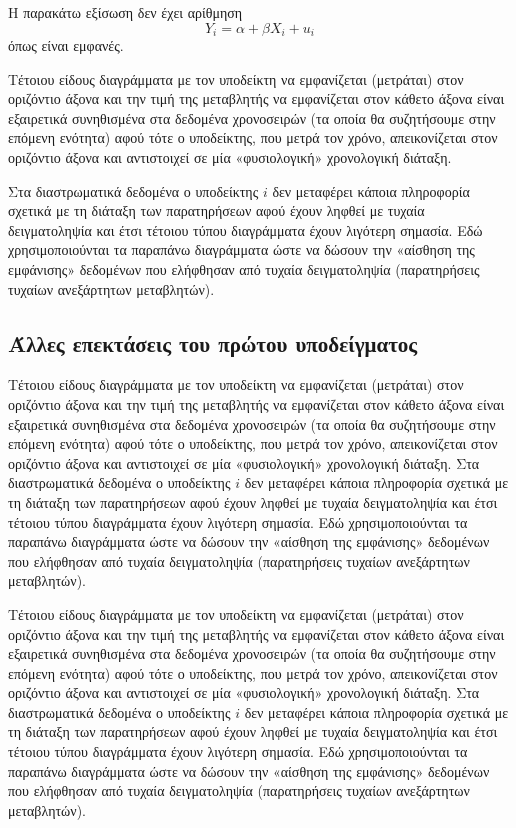 \documentclass[12pt,a4paper,oneside]{book}
\begin{document}
Η παρακάτω εξίσωση δεν έχει αρίθμηση
\begin{equation*}
Y_{i}=\alpha+\beta X_{i}+u_{i}
\end{equation*}
όπως είναι εμφανές.

Τέτοιου είδους διαγράμματα με τον υποδείκτη να εμφανίζεται (μετράται) στον οριζόντιο άξονα και την τιμή της μεταβλητής να εμφανίζεται στον κάθετο άξονα είναι εξαιρετικά συνηθισμένα στα δεδομένα χρονοσειρών (τα οποία θα συζητήσουμε στην επόμενη ενότητα) αφού τότε ο υποδείκτης, που μετρά τον χρόνο, απεικονίζεται στον οριζόντιο άξονα και αντιστοιχεί σε μία «φυσιολογική» χρονολογική διάταξη.

Στα διαστρωματικά δεδομένα ο υποδείκτης $i$ δεν μεταφέρει κάποια πληροφορία σχετικά με τη διάταξη των παρατηρήσεων αφού έχουν ληφθεί με τυχαία δειγματοληψία και έτσι τέτοιου τύπου διαγράμματα έχουν λιγότερη σημασία. Εδώ χρησιμοποιούνται τα παραπάνω διαγράμματα ώστε να δώσουν την «αίσθηση της εμφάνισης» δεδομένων που ελήφθησαν από τυχαία δειγματοληψία (παρατηρήσεις τυχαίων ανεξάρτητων μεταβλητών).

\subsection{Άλλες επεκτάσεις του πρώτου υποδείγματος}
Τέτοιου είδους διαγράμματα με τον υποδείκτη να εμφανίζεται (μετράται) στον οριζόντιο άξονα και την τιμή της μεταβλητής να εμφανίζεται στον κάθετο άξονα είναι εξαιρετικά συνηθισμένα στα δεδομένα χρονοσειρών (τα οποία θα συζητήσουμε στην επόμενη ενότητα) αφού τότε ο υποδείκτης, που μετρά τον χρόνο, απεικονίζεται στον οριζόντιο άξονα και αντιστοιχεί σε μία «φυσιολογική» χρονολογική διάταξη. Στα διαστρωματικά δεδομένα ο υποδείκτης $i$ δεν μεταφέρει κάποια πληροφορία σχετικά με τη διάταξη των παρατηρήσεων αφού έχουν ληφθεί με τυχαία δειγματοληψία και έτσι τέτοιου τύπου διαγράμματα έχουν λιγότερη σημασία. Εδώ χρησιμοποιούνται τα παραπάνω διαγράμματα ώστε να δώσουν την «αίσθηση της εμφάνισης» δεδομένων που ελήφθησαν από τυχαία δειγματοληψία (παρατηρήσεις τυχαίων ανεξάρτητων μεταβλητών).

Τέτοιου είδους διαγράμματα με τον υποδείκτη να εμφανίζεται (μετράται) στον οριζόντιο άξονα και την τιμή της μεταβλητής να εμφανίζεται στον κάθετο άξονα είναι εξαιρετικά συνηθισμένα στα δεδομένα χρονοσειρών (τα οποία θα συζητήσουμε στην επόμενη ενότητα) αφού τότε ο υποδείκτης, που μετρά τον χρόνο, απεικονίζεται στον οριζόντιο άξονα και αντιστοιχεί σε μία «φυσιολογική» χρονολογική διάταξη. Στα διαστρωματικά δεδομένα ο υποδείκτης $i$ δεν μεταφέρει κάποια πληροφορία σχετικά με τη διάταξη των παρατηρήσεων αφού έχουν ληφθεί με τυχαία δειγματοληψία και έτσι τέτοιου τύπου διαγράμματα έχουν λιγότερη σημασία. Εδώ χρησιμοποιούνται τα παραπάνω διαγράμματα ώστε να δώσουν την «αίσθηση της εμφάνισης» δεδομένων που ελήφθησαν από τυχαία δειγματοληψία (παρατηρήσεις τυχαίων ανεξάρτητων μεταβλητών).
\end{document}
